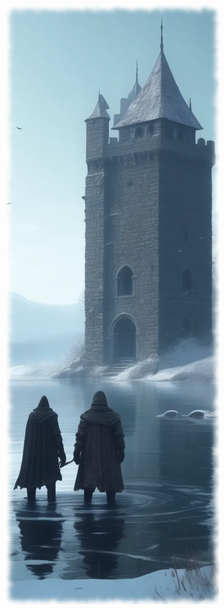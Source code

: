 \begin{figure}%
\begin{center}
\includegraphics[scale=0.4]{img/ai-images/adventurers-and-tower.png}
\end{center}
\end{figure}



